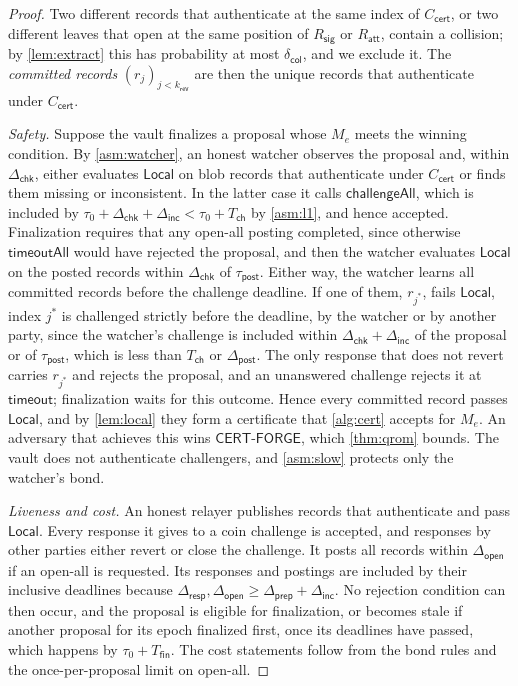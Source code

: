 \documentclass[10pt,journal,compsoc]{IEEEtran}
\theoremstyle{tplain}
\theoremstyle{tdef}
\theoremstyle{remark}
\newcommand{\Rsig}{R_{\mathsf{sig}}}
\newcommand{\Ratt}{R_{\mathsf{att}}}
\newcommand{\kr}{k_{\mathsf{rev}}}
\newcommand{\cert}{\mathsf{cert}}
\begin{document}
\begin{proof}
Two different records that authenticate at the same index of $C_{\cert}$, or two different leaves that open at the same position of $\Rsig$ or $\Ratt$, contain a collision; by \cref{lem:extract} this has probability at most $\delta_{\mathsf{col}}$, and we exclude it. The \emph{committed records} $(r_j)_{j<\kr}$ are then the unique records that authenticate under $C_{\cert}$.

\emph{Safety.} Suppose the vault finalizes a proposal whose $M_e$ meets the winning condition. By \cref{asm:watcher}, an honest watcher observes the proposal and, within $\Delta_{\mathsf{chk}}$, either evaluates $\mathsf{Local}$ on blob records that authenticate under $C_{\cert}$ or finds them missing or inconsistent. In the latter case it calls $\mathsf{challengeAll}$, which is included by $\tau_0+\Delta_{\mathsf{chk}}+\Delta_{\mathsf{inc}}<\tau_0+T_{\mathsf{ch}}$ by \cref{asm:l1}, and hence accepted. Finalization requires that any open-all posting completed, since otherwise $\mathsf{timeoutAll}$ would have rejected the proposal, and then the watcher evaluates $\mathsf{Local}$ on the posted records within $\Delta_{\mathsf{chk}}$ of $\tau_{\mathsf{post}}$. Either way, the watcher learns all committed records before the challenge deadline. If one of them, $r_{j^\ast}$, fails $\mathsf{Local}$, index $j^\ast$ is challenged strictly before the deadline, by the watcher or by another party, since the watcher's challenge is included within $\Delta_{\mathsf{chk}}+\Delta_{\mathsf{inc}}$ of the proposal or of $\tau_{\mathsf{post}}$, which is less than $T_{\mathsf{ch}}$ or $\Delta_{\mathsf{post}}$. The only response that does not revert carries $r_{j^\ast}$ and rejects the proposal, and an unanswered challenge rejects it at $\mathsf{timeout}$; finalization waits for this outcome. Hence every committed record passes $\mathsf{Local}$, and by \cref{lem:local} they form a certificate that \cref{alg:cert} accepts for $M_e$. An adversary that achieves this wins $\mathsf{CERT\text{-}FORGE}$, which \cref{thm:qrom} bounds. The vault does not authenticate challengers, and \cref{asm:slow} protects only the watcher's bond.

\emph{Liveness and cost.} An honest relayer publishes records that authenticate and pass $\mathsf{Local}$. Every response it gives to a coin challenge is accepted, and responses by other parties either revert or close the challenge. It posts all records within $\Delta_{\mathsf{open}}$ if an open-all is requested. Its responses and postings are included by their inclusive deadlines because $\Delta_{\mathsf{resp}},\Delta_{\mathsf{open}}\ge\Delta_{\mathsf{prep}}+\Delta_{\mathsf{inc}}$. No rejection condition can then occur, and the proposal is eligible for finalization, or becomes stale if another proposal for its epoch finalized first, once its deadlines have passed, which happens by $\tau_0+T_{\mathsf{fin}}$. The cost statements follow from the bond rules and the once-per-proposal limit on open-all.
\end{proof}
\end{document}
